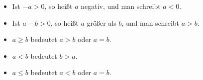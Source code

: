 \begin{itemize}
    \item Ist $-a > 0$, so heißt $a$ negativ, und man schreibt $a < 0$.
    \item Ist $a-b > 0$, so heißt $a$ größer als $b$, und man schreibt $a > b$.
    \item $a \geq b$ bedeutet $a > b$ oder $a = b$.
    \item $a < b$ bedeutet $b > a$.
    \item $a \leq b$ bedeutet $a < b$ oder $a = b$.
\end{itemize}